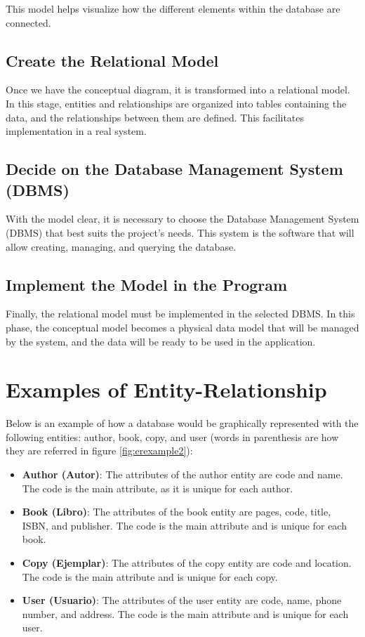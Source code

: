\documentclass{article}
\begin{document}
This model helps visualize how the different elements within the database are connected.

\subsection{Create the Relational Model}

Once we have the conceptual diagram, it is transformed into a relational model. In this stage, entities and relationships are organized into tables containing the data, and the relationships between them are defined. This facilitates implementation in a real system.

\subsection{Decide on the Database Management System (DBMS)}

With the model clear, it is necessary to choose the Database Management System (DBMS) that best suits the project's needs. This system is the software that will allow creating, managing, and querying the database.

\subsection{Implement the Model in the Program}

Finally, the relational model must be implemented in the selected DBMS. In this phase, the conceptual model becomes a physical data model that will be managed by the system, and the data will be ready to be used in the application.

\section{Examples of Entity-Relationship} \label{sec:example}

Below is an example of how a database would be graphically represented with the following entities: author, book, copy, and user (words in parenthesis are how they are referred in figure \ref{fig:erexample2}):

\begin{itemize}
    \item \textbf{Author (Autor)}: The attributes of the author entity are code and name. The code is the main attribute, as it is unique for each author.
    \item \textbf{Book (Libro)}: The attributes of the book entity are pages, code, title, ISBN, and publisher. The code is the main attribute and is unique for each book.
    \item \textbf{Copy (Ejemplar)}: The attributes of the copy entity are code and location. The code is the main attribute and is unique for each copy.
    \item \textbf{User (Usuario)}: The attributes of the user entity are code, name, phone number, and address. The code is the main attribute and is unique for each user.
\end{itemize}
\end{document}

